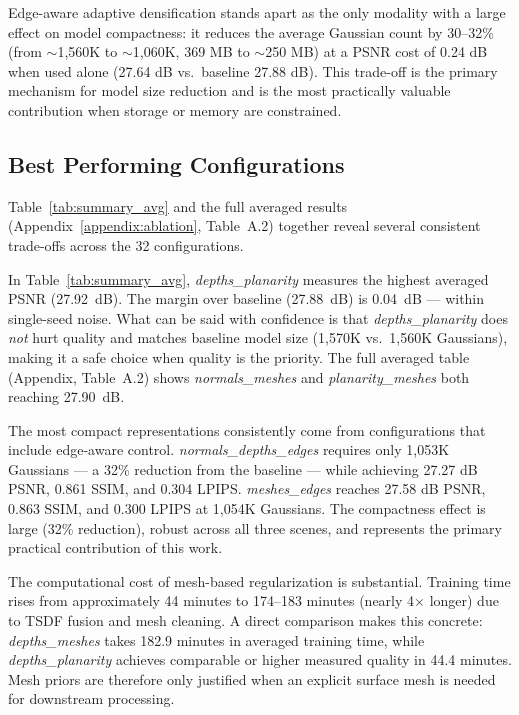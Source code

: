 Edge-aware adaptive densification stands apart as the only modality with a large effect on model compactness: it reduces the average Gaussian count by 30--32\% (from $\sim$1{,}560K to $\sim$1{,}060K, 369 MB to $\sim$250 MB) at a PSNR cost of 0.24 dB when used alone (27.64 dB vs.\ baseline 27.88 dB). This trade-off is the primary mechanism for model size reduction and is the most practically valuable contribution when storage or memory are constrained.

\subsection{Best Performing Configurations}

Table~\ref{tab:summary_avg} and the full averaged results (Appendix~\ref{appendix:ablation}, Table~A.2) together reveal several consistent trade-offs across the 32 configurations.

In Table~\ref{tab:summary_avg}, \textit{depths\_\allowbreak planarity} measures the highest averaged PSNR (27.92~dB). The margin over baseline (27.88~dB) is 0.04~dB — within single-seed noise. What can be said with confidence is that \textit{depths\_\allowbreak planarity} does \emph{not} hurt quality and matches baseline model size (1,570K vs.\ 1,560K Gaussians), making it a safe choice when quality is the priority. The full averaged table (Appendix, Table~A.2) shows \textit{normals\_\allowbreak meshes} and \textit{planarity\_\allowbreak meshes} both reaching 27.90~dB.

The most compact representations consistently come from configurations that include edge-aware control. \textit{normals\_\allowbreak depths\_\allowbreak edges} requires only 1,053K Gaussians — a 32\% reduction from the baseline — while achieving 27.27 dB PSNR, 0.861 SSIM, and 0.304 LPIPS. \textit{meshes\_\allowbreak edges} reaches 27.58 dB PSNR, 0.863 SSIM, and 0.300 LPIPS at 1,054K Gaussians. The compactness effect is large (32\% reduction), robust across all three scenes, and represents the primary practical contribution of this work.

The computational cost of mesh-based regularization is substantial. Training time rises from approximately 44 minutes to 174--183 minutes (nearly 4$\times$ longer) due to TSDF fusion and mesh cleaning. A direct comparison makes this concrete: \textit{depths\_\allowbreak meshes} takes 182.9 minutes in averaged training time, while \textit{depths\_\allowbreak planarity} achieves comparable or higher measured quality in 44.4 minutes. Mesh priors are therefore only justified when an explicit surface mesh is needed for downstream processing.

